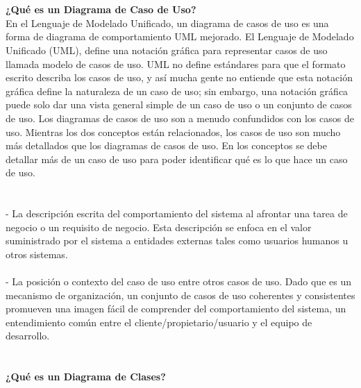 \begin{flushleft}
\textbf{}\\
\textbf{}\\
\textbf {¿Qué es un Diagrama de Caso de Uso?}\\
En el Lenguaje de Modelado Unificado, un diagrama de casos de uso es una forma de diagrama de comportamiento UML mejorado. El Lenguaje de Modelado Unificado (UML), define una notación gráfica para representar casos de uso llamada modelo de casos de uso. UML no define estándares para que el formato escrito describa los casos de uso, y así mucha gente no entiende que esta notación gráfica define la naturaleza de un caso de uso; sin embargo, una notación gráfica puede solo dar una vista general simple de un caso de uso o un conjunto de casos de uso. Los diagramas de casos de uso son a menudo confundidos con los casos de uso. Mientras los dos conceptos están relacionados, los casos de uso son mucho más detallados que los diagramas de casos de uso. En los conceptos se debe detallar más de un caso de uso para poder identificar qué es lo que hace un caso de uso.\\
\textbf{}\\
\textbf{}\\
-  La descripción escrita del comportamiento del sistema al afrontar una tarea de negocio o un requisito de negocio. Esta descripción se enfoca en el valor suministrado por el sistema a entidades externas tales como usuarios humanos u otros sistemas.\\
\textbf{}\\

-  La posición o contexto del caso de uso entre otros casos de uso. Dado que es un mecanismo de organización, un conjunto de casos de uso coherentes y consistentes promueven una imagen fácil de comprender del comportamiento del sistema, un entendimiento común entre el cliente/propietario/usuario y el equipo de desarrollo.\\

\textbf{}\\
\textbf{}\\
\textbf {¿Qué es un Diagrama de Clases?}\\


\end{flushleft}
